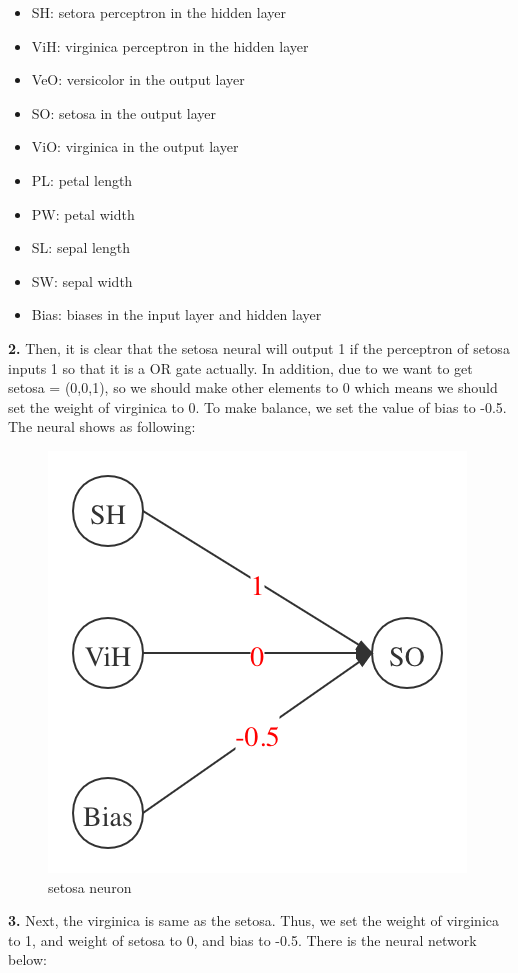 \documentclass{article}
\begin{document}
\noindent
\begin{itemize}
	\item SH: setora perceptron in the hidden layer
	\item ViH: virginica perceptron in the hidden layer
	\item VeO: versicolor in the output layer
	\item SO: setosa in the output layer
	\item ViO: virginica in the output layer
	\item PL: petal length
	\item PW: petal width
	\item SL: sepal length
	\item SW: sepal width
	\item Bias: biases in the input layer and hidden layer
\end{itemize}
\textbf{2.} Then, it is clear that the setosa neural will output 1 if the perceptron of setosa inputs 1 so that it is a OR gate actually. In addition, due to we want to get setosa = (0,0,1), so we should make other elements to 0 which means we should set the weight of virginica to 0. To make balance, we set the value of bias to -0.5. The neural shows as following:
\begin{figure}[H]
\centering
\includegraphics[scale=0.3]{SO.png}
\caption{setosa neuron}
\end{figure}
\noindent
\textbf{3.} Next, the virginica is same as the setosa. Thus, we set the weight of virginica to 1, and weight of setosa to 0, and bias to -0.5. There is the neural network below:
\end{document}
